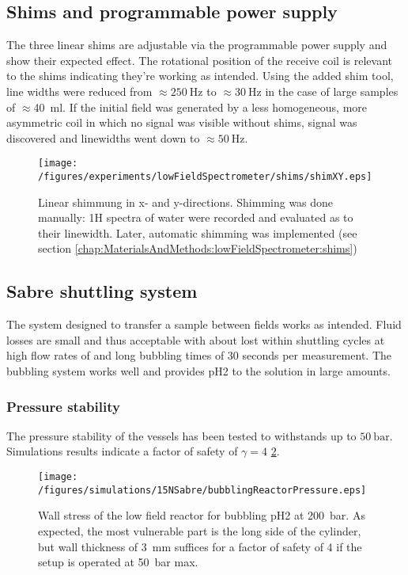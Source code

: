         \subsection{Shims and programmable power supply}
            The three linear shims are adjustable via the programmable power supply and show
            their expected effect. The rotational position of the receive coil is relevant to the
            shims indicating they're working as intended. Using the added shim tool, line widths
            were reduced from $\approx \SI{250}{\hertz}$ to $\approx \SI{30}{\hertz}$ in the case of large samples of $\approx
            $\SI{40}{\milli\litre}. If the initial field was generated by a less homogeneous, more
            asymmetric coil in which no signal was visible without shims, signal was discovered and linewidths went down to
            $\approx \SI{50}{\hertz}$.
            \begin{figure}[h]
                \label{fig:results:lowFieldSpectrometer:shims}
                \texttt{[image: /figures/experiments/lowFieldSpectrometer/shims/shimXY.eps]}
                \caption{Linear shimmung in x- and y-directions. Shimming was done manually: 1H spectra of water were recorded and evaluated as to their linewidth. Later, automatic shimming was implemented (see section \ref{chap:MaterialsAndMethods:lowFieldSpectrometer:shims})}
            \end{figure}
    \subsection{Sabre shuttling system}
        The system designed to transfer a sample between fields works as intended. Fluid losses are
        small and thus acceptable with about  lost within  shuttling cycles at high flow rates of  and long bubbling times of 30 seconds per measurement. The
        bubbling system works well and provides pH2 to the solution in large amounts. 
        \subsubsection{Pressure stability}
        The pressure stability of the vessels has been tested to withstands up to $\SI{50}{\bar}$. Simulations results indicate a factor of safety of $\gamma = 4$ \ref{fig:results:bubblingReactorPressure}.
        \begin{figure}
            \label{fig:results:bubblingReactorPressure}
            \centering
            \texttt{[image: /figures/simulations/15NSabre/bubblingReactorPressure.eps]}
            \caption{Wall stress of the low field reactor for bubbling pH2 at \SI{200}{\bar}. As expected, the most vulnerable part is the long side of the cylinder, but wall thickness of \SI{3}{\milli\meter} suffices for a factor of safety of 4 if the setup is operated at \SI{50}{\bar} max.}
        \end{figure}
        
